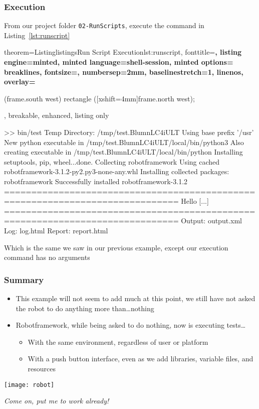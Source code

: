 \documentclass[xcolor=table,handout]{beamer}
\newcounter{listings}
\begin{document}
\begin{frame}[fragile, shrink=20]\frametitle{Execution}
    From our project folder \texttt{02-RunScripts}, execute the command in Listing~\ref{lst:runscript}
\begin{tcblisting}{%
     theorem={Listing}{listings}{Run Script Execution}{lst:runscript},
     fonttitle=\scriptsize\bfseries,
     listing engine=minted,
     minted language=shell-session,
     minted options={%
         breaklines,
         fontsize=\tiny,
         numbersep=2mm,
         baselinestretch=1,
         linenos},
     overlay={%
       \begin{tcbclipinterior}
           \fill[gray!25] (frame.south west) rectangle ([xshift=4mm]frame.north west);
       \end{tcbclipinterior}},
     breakable, enhanced, listing only}
>> bin/test
Temp Directory: /tmp/test.BlumnLC4iULT
Using base prefix '/usr'
New python executable in /tmp/test.BlumnLC4iULT/local/bin/python3
Also creating executable in /tmp/test.BlumnLC4iULT/local/bin/python
Installing setuptools, pip, wheel...done.
Collecting robotframework
  Using cached robotframework-3.1.2-py2.py3-none-any.whl
Installing collected packages: robotframework
Successfully installed robotframework-3.1.2
==============================================================================
Hello
[...]
==============================================================================
Output:  output.xml
Log:     log.html
Report:  report.html
\end{tcblisting}
Which is the same we saw in our previous example, except our execution command has no arguments 
\end{frame}

\begin{frame}\frametitle{Summary}
    \begin{itemize}
        \item This example will not seem to add much at this point, we still have not asked the robot to do anything more than\ldots nothing
        \item Robotframework, while being asked to do nothing, now is executing tests\ldots
            \begin{itemize}\footnotesize
                \item With the same environment, regardless of user or platform
                \item With a push button interface, even as we add libraries, variable files, and resources
            \end{itemize}
    \end{itemize}
    \begin{center}
    \texttt{[image: robot]}
        
    \emph{Come on, put me to work already!}
    \end{center}
\end{frame}
\end{document}
